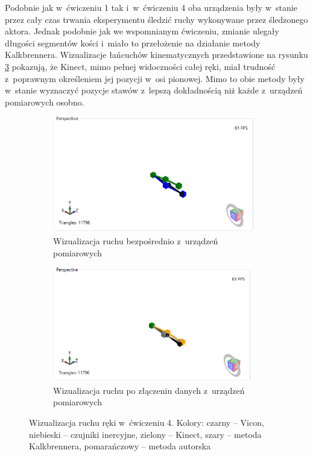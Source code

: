Podobnie jak w~ćwiczeniu 1 tak i~w~ćwiczeniu 4 oba urządzenia były w~stanie przez cały czas trwania eksperymentu śledzić ruchy wykonywane przez śledzonego aktora. Jednak podobnie jak we wspomnianym ćwiczeniu, zmianie ulegały długości segmentów kości i~miało to przełożenie na działanie metody Kalkbrennera. Wizualizacje łańcuchów kinematycznych przedstawione na rysunku \ref{fig:experiments:four} pokazują, że Kinect, mimo pełnej widoczności całej ręki, miał trudność z~poprawnym określeniem jej pozycji w~osi pionowej. Mimo to obie metody były w~stanie wyznaczyć pozycje stawów z~lepszą dokładnością niż każde z~urządzeń pomiarowych osobno.
\begin{figure}[!htb]
	\captionsetup{singlelinecheck=off}
	\centering
	\begin{subfigure}[b]{0.49\textwidth}
		\centering
		\includegraphics[width=\linewidth]{images/400/raw.png}	
		\caption{Wizualizacja ruchu bezpośrednio z~urządzeń pomiarowych}
		\label{fig:experiments:four:raw}
	\end{subfigure}
					
	\begin{subfigure}[b]{0.49\textwidth}
		\centering
		\includegraphics[width=\linewidth]{images/400/Fused.png}		
		\caption{Wizualizacja ruchu po złączeniu danych z~urządzeń pomiarowych}
		\label{fig:experiments:four:fused}	
	\end{subfigure}
				
	\caption{Wizualizacja ruchu ręki w~ćwiczeniu 4.  Kolory: czarny -- Vicon, niebieski -- czujniki inercyjne, zielony -- Kinect, szary -- metoda Kalkbrennera, pomarańczowy -- metoda autorska}	
	\label{fig:experiments:four}
\end{figure}

